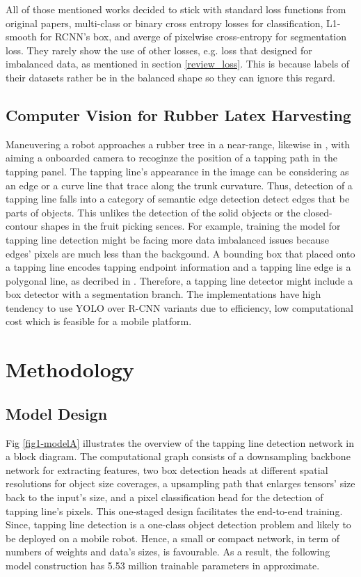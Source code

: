 \documentclass[default,pdflatex,iicol]{sn-jnl}%
\begin{document}
All of those mentioned works decided to stick with standard loss functions from original papers, multi-class or binary cross entropy losses for classification, L1-smooth for RCNN's box, and averge of pixelwise cross-entropy for segmentation loss. They rarely show the use of other losses, e.g. loss that designed for imbalanced data, as mentioned in section \ref{review_loss}. This is because labels of their datasets rather be in the balanced shape so they can ignore this regard.

\subsection{Computer Vision for Rubber Latex Harvesting}
Maneuvering a robot approaches a rubber tree in a near-range, likewise in \cite{zhang2019rubber, WANG2022103906}, with aiming a onboarded camera to recoginze the position of a tapping path in the tapping panel. The tapping line's appearance in the image can be considering as an edge or a curve line that trace along the trunk curvature. Thus, detection of a tapping line falls into a category of semantic edge detection \textemdash detect edges that be parts of objects. This unlikes the detection of the solid objects or the closed-contour shapes in the fruit picking sences. For example, training the model for tapping line detection might be facing more data imbalanced issues because edges' pixels are much less than the backgound. A bounding box that placed onto a tapping line encodes tapping endpoint information and a tapping line edge is a polygonal line, as decribed in \cite{Wongtanawijit_2021}. Therefore, a tapping line detector might include a box detector with a segmentation branch. The implementations have high tendency to use YOLO over R-CNN variants due to efficiency, low computational cost which is feasible for a mobile platform.


\section{Methodology}\label{sec-methodology}
\subsection{Model Design}\label{subsec-model}
Fig \ref{fig1-modelA} illustrates the overview of the tapping line detection network in a block diagram. The computational graph consists of a downsampling backbone network for extracting features, two box detection heads at different spatial resolutions for object size coverages, a upsampling path that enlarges tensors' size back to the input's size, and a pixel classification head for the detection of tapping line's pixels. This one-staged design facilitates the end-to-end training. Since, tapping line detection is a one-class object detection problem and likely to be deployed on a mobile robot. Hence, a small or compact network, in term of numbers of weights and data's sizes, is favourable. As a result, the following model construction has 5.53 million trainable parameters in approximate.
\end{document}
